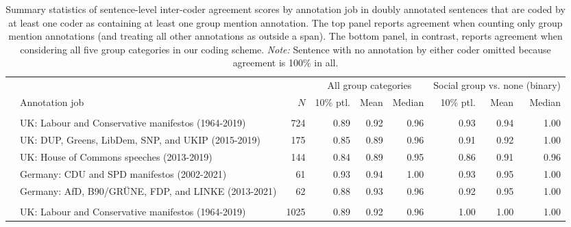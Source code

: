 \begin{table}[!t]

\caption{\label{tab:intercoder_agreement}Summary statistics of sentence-level inter-coder agreement scores by annotation job in doubly annotated sentences that are coded by at least one coder as containing at least one group mention annotation. The top panel reports agreement when counting only group mention annotations (and treating all other annotations as outside a span). The bottom panel, in contrast, reports agreement when considering all five group categories in our coding scheme. \emph{Note:} Sentence with no annotation by either coder omitted because agreement is 100\% in all.}
\centering
\fontsize{10}{12}\selectfont
\begin{tabular}[t]{llrrrrrrr}
\toprule
\multicolumn{3}{c}{ } & \multicolumn{3}{c}{All group categories} & \multicolumn{3}{c}{Social group vs. none (binary)} \\
\cmidrule(l{3pt}r{3pt}){4-6} \cmidrule(l{3pt}r{3pt}){7-9}
 & Annotation job & $N$ & 10\% ptl. & Mean & Median & 10\% ptl. & Mean & Median\\
\midrule
\addlinespace[0.3em]
\multicolumn{9}{l}{\textbf{min. one social group mention}}\\
\hspace{1em} & UK: Labour and Conservative manifestos (1964-2019) & 724 & 0.89 & 0.92 & 0.96 & 0.93 & 0.94 & 1.00\\

\hspace{1em} & UK: DUP, Greens, LibDem, SNP, and UKIP (2015-2019) & 175 & 0.85 & 0.89 & 0.96 & 0.91 & 0.92 & 1.00\\

\hspace{1em} & UK: House of Commons speeches (2013-2019) & 144 & 0.84 & 0.89 & 0.95 & 0.86 & 0.91 & 0.96\\

\hspace{1em} & Germany: CDU and SPD manifestos (2002-2021) & 61 & 0.93 & 0.94 & 1.00 & 0.93 & 0.95 & 1.00\\

\hspace{1em} & Germany: AfD, B90/GRÜNE, FDP, and LINKE (2013-2021) & 62 & 0.88 & 0.93 & 0.96 & 0.92 & 0.95 & 1.00\\
\cmidrule{1-9}
\addlinespace[0.3em]
\multicolumn{9}{l}{\textbf{no social group mention}}\\
\hspace{1em} & UK: Labour and Conservative manifestos (1964-2019) & 1025 & 0.89 & 0.92 & 0.96 & 1.00 & 1.00 & 1.00\\


\end{tabular}
\end{table}
